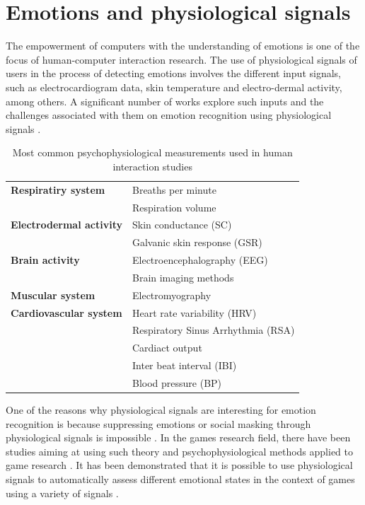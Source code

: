 \chapter{Emotions and physiological signals}
\label{ch:literature-physiological}

The empowerment of computers with the understanding of emotions is one of the focus of human-computer interaction research. The use of physiological signals of users in the process of detecting emotions involves the different input signals, such as electrocardiogram data, skin temperature and electro-dermal activity, among others. A significant number of works explore such inputs and the challenges associated with them on emotion recognition using physiological signals \parencite{jerritta2011physiological}.


\begin{table}[h]
\caption{Most common psychophysiological measurements used in human interaction studies \parencite{jerritta2011physiological}}
\label{table:physiological-signals}
\begin{tabular}{L{.4\linewidth}L{.5\linewidth}}%
\toprule%
\textbf{Respiratiry system} & Breaths per minute\\
 & Respiration volume \\
\midrule
 \textbf{Electrodermal activity} & Skin conductance (SC) \\
 & Galvanic skin response (GSR) \\
\midrule
\textbf{Brain activity} & Electroencephalography (EEG) \\
& Brain imaging methods \\
\midrule
\textbf{Muscular system} & Electromyography \\
\midrule
\textbf{Cardiovascular system} & Heart rate variability (HRV) \\
& Respiratory Sinus Arrhythmia (RSA)  \\
& Cardiact output  \\
& Inter beat interval (IBI) \\
& Blood pressure (BP)  \\
\bottomrule%
\end{tabular}%
\end{table}

One of the reasons why physiological signals are interesting for emotion recognition is because suppressing emotions or social masking through physiological signals is impossible \parencite{kim2004emotion}. In the games research field, there have been studies aiming at using such theory and psychophysiological methods applied to game research \parencite{kivikangas2011review}. It has been demonstrated that it is possible to use physiological signals to automatically assess different emotional states in the context of games using a variety of signals \parencite{bousefsaf2013remote,yun2009game,rani2006empirical,tijs2008dynamic}.

